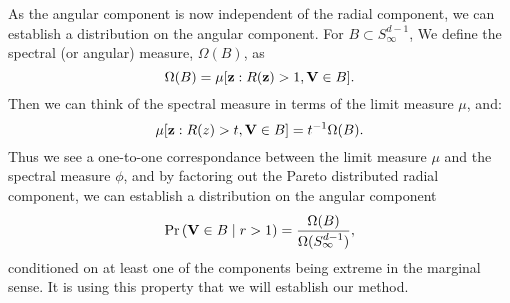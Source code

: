 As the angular component is now independent of the radial component, we can
  establish a distribution on the angular component.  For
  $B\subset S_{\infty}^{d-1}$, We define the spectral (or angular) measure,
  $\Omega(B)$, as
\begin{equation}
  \Omega(B) = \mu[{\bf z}: R({\bf z}) > 1, {\bf V} \in B].
\end{equation}
Then we can think of the spectral measure in terms of the limit measure $\mu$,
  and:
\begin{equation}
  \mu[{\bf z}:R(z)>t, {\bf V}\in B] = t^{-1}\Omega(B).
\end{equation}
Thus we see a one-to-one correspondance between the limit measure $\mu$ and the
  spectral measure $\phi$, and by factoring out the Pareto distributed radial
  component, we can establish a distribution on the angular component
\begin{equation}
  \text{Pr}\left({\bf V} \in B \mid r > 1\right) = \frac{\Omega(B)}{\Omega(S_{\infty}^{d-1})},
\end{equation}
conditioned on at least one of the components being extreme in the marginal
  sense.  It is using this property that we will establish our method.

